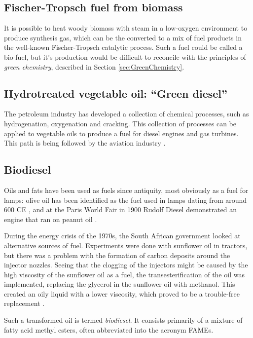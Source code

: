 \subsection{Fischer-Tropsch fuel from biomass}
\label{sec:FT}

It is possible to heat woody biomass with steam in a low-oxygen environment to
produce synthesis gas, which can be the converted to a mix of fuel products in
the well-known Fischer-Tropsch catalytic process. Such a  fuel could be called a
bio-fuel, but it's production would be difficult to reconcile with the
principles of \textit{green chemistry}, described in Section
\ref{sec:GreenChemistry}.

\subsection{Hydrotreated vegetable oil: ``Green diesel''}
\label{sec:GreenDiesel}

The petroleum industry has developed a collection of chemical processes, such as
hydrogenation, oxygenation and cracking. This collection of processes can be
applied to vegetable oils to produce a fuel for diesel engines and gas turbines.
This path is being followed by the aviation industry \autocite{Chiaramonti2014}.

\subsection{Biodiesel}

Oils and fats have been used as fuels since antiquity, most obviously as a fuel
for lamps: olive oil has been identified as the fuel used in lamps dating from
around 600 CE \autocite{Kimpe2001}, and at the Paris World Fair in 1900 Rudolf
Diesel demonstrated an engine that ran on peanut oil \autocite{Knothe2010}.

During the energy crisis of the 1970s, the South African government looked at
alternative sources of fuel. Experiments were done with sunflower oil in
tractors, but there was a problem with the formation of carbon deposits around
the injector nozzles. Seeing that the clogging of the injectors might be caused
by the high viscosity of the sunflower oil as a fuel, the transesterification of
the oil was implemented, replacing the glycerol in the sunflower oil with
methanol. This created an oily liquid with a lower viscosity, which proved to be
a trouble-free replacement \autocite{VanNiekerk1980}.

Such a transformed oil is termed \textit{biodiesel}. It consists primarily of a
mixture of fatty acid methyl esters, often abbreviated into the acronym FAMEs.

